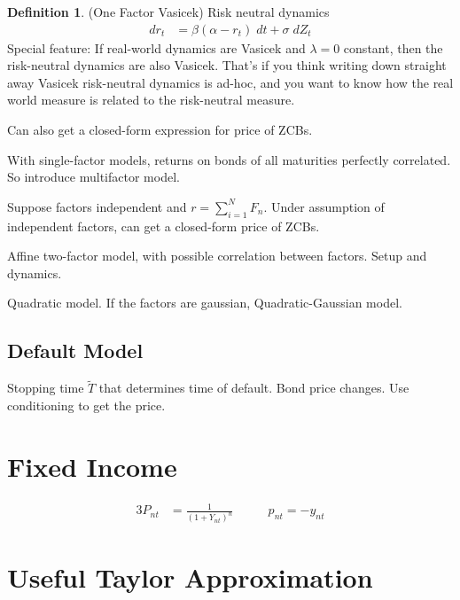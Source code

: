 \documentclass[12pt]{article}
\theoremstyle{plain}
\theoremstyle{definition}
\newtheorem{defn}[thm]{Definition}
\theoremstyle{remark}
\newcommand{\sumiN}{\sum^N_{i=1}}
\begin{document}
\begin{defn}(One Factor Vasicek)
Risk neutral dynamics
\begin{align*}
  dr_t
  &=
  \beta(\alpha-r_t)\;dt
  +
  \sigma\;dZ_t
\end{align*}
Special feature: If real-world dynamics are Vasicek and $\lambda=0$
constant, then the risk-neutral dynamics are also Vasicek. That's if you
think writing down straight away Vasicek risk-neutral dynamics is
ad-hoc, and you want to know how the real world measure is related to
the risk-neutral measure.

Can also get a closed-form expression for price of ZCBs.
\end{defn}

With single-factor models, returns on bonds of all maturities perfectly
correlated.
So introduce multifactor model.

Suppose factors independent and $r=\sumiN F_n$. Under assumption of
independent factors, can get a closed-form price of ZCBs.

Affine two-factor model, with possible correlation between factors.
Setup and dynamics.

Quadratic model. If the factors are gaussian, Quadratic-Gaussian model.


\clearpage
\subsection{Default Model}

Stopping time $\tilde{T}$ that determines time of default.
Bond price changes. Use conditioning to get the price.



\clearpage
\section{Fixed Income}

\begin{alignat*}{3}
  P_{nt}
  &=
  \frac{1}{(1+Y_{nt})^n}
  \qquad
  &
  p_{nt} = -y_{nt}
\end{alignat*}












\newpage
\appendix

\clearpage
\section{Useful Taylor Approximation}
\end{document}
